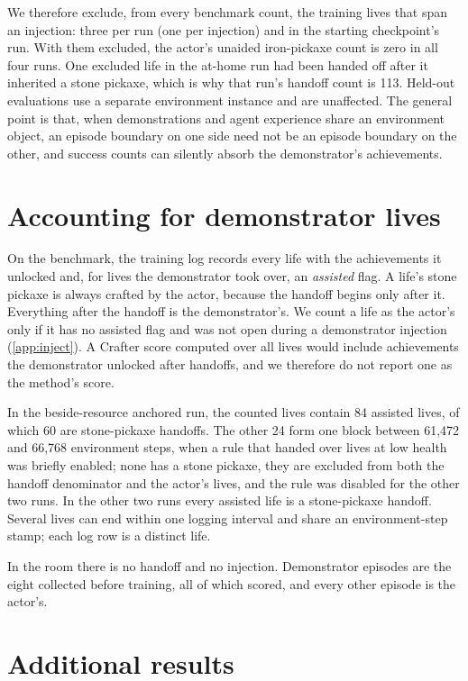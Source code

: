 We therefore exclude, from every benchmark count, the training lives that span an injection: three per run (one per injection) and \StartSpanning{} in the starting checkpoint's run.
With them excluded, the actor's unaided iron-pickaxe count is zero in all four runs.
One excluded life in the at-home run had been handed off after it inherited a stone pickaxe, which is why that run's handoff count is 113.
Held-out evaluations use a separate environment instance and are unaffected.
The general point is that, when demonstrations and agent experience share an environment object, an episode boundary on one side need not be an episode boundary on the other, and success counts can silently absorb the demonstrator's achievements.

\section{Accounting for demonstrator lives}
\label{app:accounting}

On the benchmark, the training log records every life with the achievements it unlocked and, for lives the demonstrator took over, an \emph{assisted} flag.
A life's stone pickaxe is always crafted by the actor, because the handoff begins only after it.
Everything after the handoff is the demonstrator's.
We count a life as the actor's only if it has no assisted flag and was not open during a demonstrator injection (\cref{app:inject}).
A Crafter score computed over all lives would include achievements the demonstrator unlocked after handoffs, and we therefore do not report one as the method's score.

In the beside-resource anchored run, the \BenchMTwoTwoFieldCraftLives{} counted lives contain 84 assisted lives, of which 60 are stone-pickaxe handoffs.
The other 24 form one block between 61,472 and 66,768 environment steps, when a rule that handed over lives at low health was briefly enabled; none has a stone pickaxe, they are excluded from both the handoff denominator and the actor's lives, and the rule was disabled for the other two runs.
In the other two runs every assisted life is a stone-pickaxe handoff.
Several lives can end within one logging interval and share an environment-step stamp; each log row is a distinct life.

In the room there is no handoff and no injection.
Demonstrator episodes are the eight collected before training, all of which scored, and every other episode is the actor's.

\section{Additional results}
\label{app:extra}

